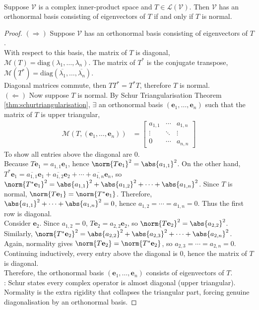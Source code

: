 \begin{theorem} \label{thm:complexspectralthm} \\
Suppose $\mathcal{V}$ is a complex inner-product space and $T \in \mathcal{L}(\mathcal{V})$. Then $\mathcal{V}$ has an orthonormal basis consisting of eigenvectors of $T$ if and only if $T$ is normal.
\begin{proof} $(\Rightarrow)$ Suppose $\mathcal{V}$ has an orthonormal basis consisting of eigenvectors of $T$.\\
With respect to this basis, the matrix of $T$ is diagonal, $\mathcal{M}(T) = \text{diag}(\lambda_1, \ldots, \lambda_n)$. The matrix of $T^*$ is the conjugate transpose,  $\mathcal{M}(T^*) = \text{diag}(\overline{\lambda_1}, \ldots, \overline{\lambda_n})$.\\
Diagonal matrices commute, then $T T^* = T^* T$, therefore $T$ is normal.\\
$(\Leftarrow)$ Now suppose $T$ is normal. By Schur Triangularisation Theorem \ref{thm:schurtriangularisation}, $\exists$ an orthonormal basis $(\mathbf{e}_1, \ldots, \mathbf{e}_n)$ such that the matrix of $T$ is upper triangular,
\begin{align}
\mathcal{M}(T, (\mathbf{e}_1, \ldots, \mathbf{e}_n)) &=
\begin{bmatrix}
a_{1,1} & \cdots & a_{1,n} \\
\vdots & \ddots & \vdots \\
0 & \cdots & a_{n,n}
\end{bmatrix} \nonumber
\end{align}
To show all entries above the diagonal are $0$.\\
Because $T \mathbf{e}_1 = a_{1,1} \mathbf{e}_1$, hence $\norm{T \mathbf{e}_1}^2 = \abs{a_{1,1}}^2$. On the other hand, $T^* \mathbf{e}_1 = \overline{a_{1,1}}\mathbf{e}_1 + \overline{a_{1,2}}\mathbf{e}_2 + \cdots + \overline{a_{1,n}}\mathbf{e}_n$, so $\norm{T^* \mathbf{e}_1}^2 = \abs{a_{1,1}}^2 + \abs{a_{1,2}}^2 + \cdots + \abs{a_{1,n}}^2$. Since $T$ is normal, $\norm{T \mathbf{e}_1} = \norm{T^* \mathbf{e}_1}$. Therefore, $\abs{a_{1,1}}^2 + \cdots + \abs{a_{1,n}}^2 = 0$, hence $a_{1,2} = \cdots = a_{1,n} = 0$. Thus the first row is diagonal.\\
Consider $\mathbf{e}_2$. Since $a_{1,2} = 0$, $T \mathbf{e}_2 = a_{2,2}\mathbf{e}_2$, so $\norm{T \mathbf{e}_2}^2 = \abs{a_{2,2}}^2$. Similarly, $\norm{T^* \mathbf{e}_2}^2 = \abs{a_{2,2}}^2 + \abs{a_{2,3}}^2 + \cdots + \abs{a_{2,n}}^2$. Again, normality gives $\norm{T \mathbf{e}_2} = \norm{T^* \mathbf{e}_2}$, so $a_{2,3} = \cdots = a_{2,n} = 0$.\\
Continuing inductively, every entry above the diagonal is $0$, hence the matrix of $T$ is diagonal.\\
Therefore, the orthonormal basis $(\mathbf{e}_1, \ldots, \mathbf{e}_n)$ consists of eigenvectors of $T$.\\
: Schur states every complex operator is almost diagonal (upper triangular). Normality is the extra rigidity that collapses the triangular part, forcing genuine diagonalisation by an orthonormal basis.
\end{proof}
\end{theorem}

